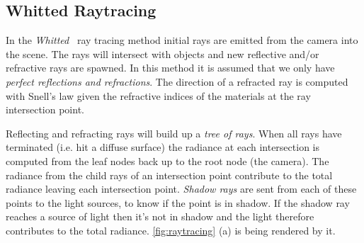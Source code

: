 \documentclass[a4paper, twocolumn]{article}
\begin{document}
    \subsection{Whitted Raytracing} \label{sec:whitted_raytracing}

    In the \emph{Whitted}~\cite{whitted1980improved} ray tracing method initial rays are emitted from the camera into the scene. The rays will intersect with objects and new reflective and/or refractive rays are spawned. In this method it is assumed that we only have \emph{perfect reflections and refractions}. The direction of a refracted ray is computed with Snell's law given the refractive indices of the materials at the ray intersection point.

    Reflecting and refracting rays will build up a \emph{tree of rays}. When all rays have terminated (i.e. hit a diffuse surface) the radiance at each intersection is computed from the leaf nodes back up to the root node (the camera). The radiance from the child rays of an intersection point contribute to the total radiance leaving each intersection point. \emph{Shadow rays} are sent from each of these points to the light sources, to know if the point is in shadow. If the shadow ray reaches a source of light then it's not in shadow and the light therefore contributes to the total radiance. \cref{fig:raytracing} (a) is being rendered by it.
\end{document}
